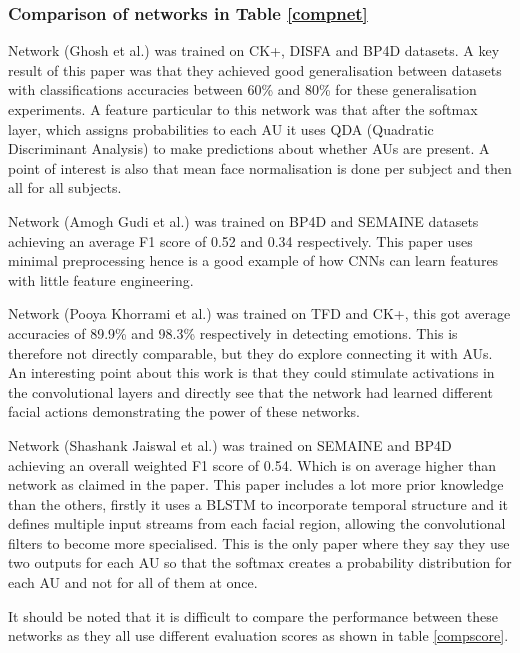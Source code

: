 \documentclass[9pt]{article} \usepackage{amsmath, amsthm, amssymb}
\begin{document}
%
%
%






\subsubsection*{Comparison of networks in Table \ref{compnet}}
Network \cite{Ghosh2015} (Ghosh et al.) was trained on CK+, DISFA and BP4D datasets.
A key result of this paper was that they achieved good generalisation between datasets
with classifications accuracies between 60\% and 80\% for these generalisation experiments.
A feature particular to this network was that after the softmax layer, which assigns probabilities
to each AU it uses QDA (Quadratic Discriminant Analysis) \cite{precogbook} to
make predictions about whether AUs are present. A point of interest is also that
mean face normalisation is done per subject and then all for all subjects.

Network \cite{Gudi2015} (Amogh Gudi et al.) was trained on BP4D and SEMAINE
datasets achieving an average F1 score of 0.52 and 0.34 respectively. This paper
uses minimal preprocessing hence is a good example of how CNNs can learn features
with little feature engineering.

Network \cite{dodeeplearn} (Pooya Khorrami et al.) was trained on TFD and CK+,
this got average accuracies of 89.9\% and 98.3\% respectively in detecting emotions. This
is therefore not directly comparable, but they do explore connecting it with AUs.
An interesting point about this work is that they could stimulate activations in the convolutional
layers and directly see that the network had learned different facial actions demonstrating the
power of these networks.

Network \cite{Jaiswal2016} (Shashank Jaiswal et al.) was trained on SEMAINE and
BP4D achieving an overall weighted F1 score of 0.54. Which is on average higher
than network \cite{Gudi2015} as claimed in the paper. This paper includes a lot more
prior knowledge than the others, firstly it uses a BLSTM to incorporate temporal structure
and it defines multiple input streams from each facial region, allowing the convolutional
filters to become more specialised. This is the only paper where they say they use
two outputs for each AU so that the softmax creates a probability distribution for
each AU and not for all of them at once.

It should be noted that it is difficult to compare the performance between these
networks as they all use different evaluation scores as shown in table \ref{compscore}.
\end{document}
